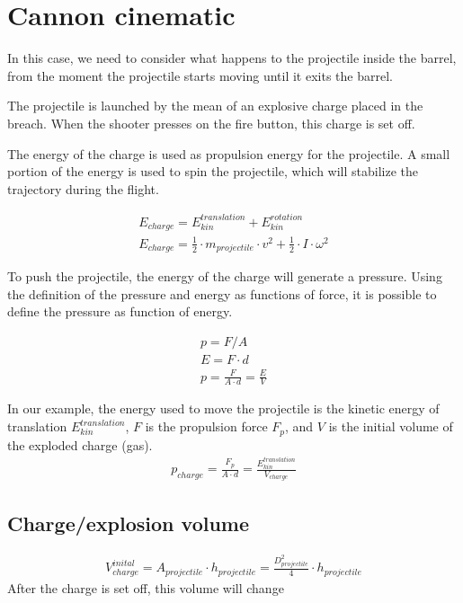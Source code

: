 \documentclass[12pt,a4paper]{article}
\begin{document}
	\section{Cannon cinematic}
	In this case, we need to consider what happens to the projectile inside the barrel, from the moment the projectile starts moving until it exits the barrel. 
	
	The projectile is launched by the mean of an explosive charge placed in the breach. 
	When the shooter presses on the fire button, this charge is set off. 
	
	The energy of the charge is used as propulsion energy for the projectile. A small portion of the energy is used to spin the projectile, which will stabilize the trajectory during the flight. 
	
	\begin{eqnarray}
		E_{charge} = E_{kin}^{translation} + E_{kin}^{rotation} \\
		E_{charge} = \frac{1}{2} \cdot m_{projectile} \cdot v^2 + \frac{1}{2} \cdot I \cdot \omega ^ 2
	\end{eqnarray}
	
	To push the projectile, the energy of the charge will generate a pressure. Using the definition of the pressure and energy as functions of force, it is possible to define the pressure as function of energy. 
	
	\begin{eqnarray}
		p = F/A \\
		E = F \cdot d \\
		p = \frac{F}{A \cdot d} = \frac{E}{V}
	\end{eqnarray}
	
	In our example, the energy used to move the projectile is the kinetic energy of translation $E_{kin}^{translation}$, $F$ is the propulsion force $F_p$, and $V$ is the initial volume of the exploded charge (gas).
	\begin{eqnarray}
		p_{charge} = \frac{F_p}{A \cdot d} = \frac{E_{kin}^{translation}}{V_{charge}}
	\end{eqnarray}
	
	\subsection{Charge/explosion volume}
	\begin{eqnarray}
		V_{charge}^{inital} = A_{ projectile} \cdot h_{projectile} =  \frac{D_{projectile}^2}{4} \cdot h_{projectile}
	\end{eqnarray}
	After the charge is set off, this volume will change
	
\end{document}
